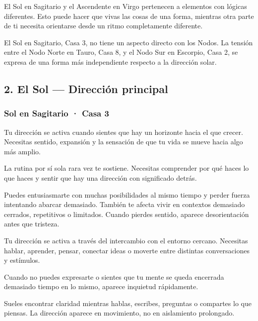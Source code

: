 \documentclass[11pt,a4paper]{article}
\begin{document}
El Sol en Sagitario y el Ascendente en Virgo pertenecen a elementos con lógicas diferentes. Esto puede hacer que vivas las cosas de una forma, mientras otra parte de ti necesita orientarse desde un ritmo completamente diferente.

El Sol en Sagitario, Casa 3, no tiene un aspecto directo con los Nodos. La tensión entre el Nodo Norte en Tauro, Casa 8, y el Nodo Sur en Escorpio, Casa 2, se expresa de una forma más independiente respecto a la dirección solar.

\vspace{0.6cm}

\subsection{2. El Sol — Dirección principal}

\subsubsection*{Sol en Sagitario · Casa 3}

Tu dirección se activa cuando sientes que hay un horizonte hacia el que crecer. Necesitas sentido, expansión y la sensación de que tu vida se mueve hacia algo más amplio.

La rutina por sí sola rara vez te sostiene. Necesitas comprender por qué haces lo que haces y sentir que hay una dirección con significado detrás.

Puedes entusiasmarte con muchas posibilidades al mismo tiempo y perder fuerza intentando abarcar demasiado. También te afecta vivir en contextos demasiado cerrados, repetitivos o limitados. Cuando pierdes sentido, aparece desorientación antes que tristeza.

Tu dirección se activa a través del intercambio con el entorno cercano. Necesitas hablar, aprender, pensar, conectar ideas o moverte entre distintas conversaciones y estímulos.

Cuando no puedes expresarte o sientes que tu mente se queda encerrada demasiado tiempo en lo mismo, aparece inquietud rápidamente.

Sueles encontrar claridad mientras hablas, escribes, preguntas o compartes lo que piensas. La dirección aparece en movimiento, no en aislamiento prolongado.


\vspace{0.6cm}
\end{document}
